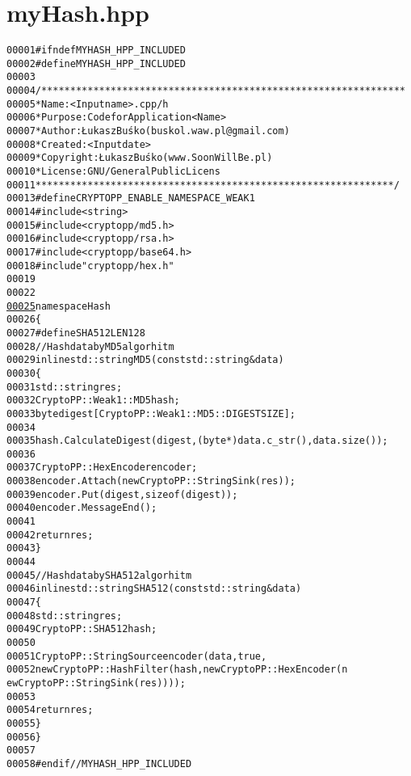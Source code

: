\hypertarget{myHash_8hpp_source}{
\section{myHash.hpp}
}


\begin{footnotesize}\begin{alltt}
00001 \textcolor{preprocessor}{#ifndef MYHASH\_HPP\_INCLUDED}
00002 \textcolor{preprocessor}{}\textcolor{preprocessor}{#define MYHASH\_HPP\_INCLUDED}
00003 \textcolor{preprocessor}{}
00004 \textcolor{comment}{/***************************************************************}
00005 \textcolor{comment}{ * Name:      <Input name>.cpp/h}
00006 \textcolor{comment}{ * Purpose:   Code for Application <Name>}
00007 \textcolor{comment}{ * Author:    Łukasz Buśko (buskol.waw.pl@gmail.com)}
00008 \textcolor{comment}{ * Created:   <Input date>}
00009 \textcolor{comment}{ * Copyright: Łukasz Buśko (www.SoonWillBe.pl)}
00010 \textcolor{comment}{ * License:   GNU / General Public Licens}
00011 \textcolor{comment}{ **************************************************************/}
00013 \textcolor{preprocessor}{#define CRYPTOPP\_ENABLE\_NAMESPACE\_WEAK 1}
00014 \textcolor{preprocessor}{}\textcolor{preprocessor}{#include <string>}
00015 \textcolor{preprocessor}{#include <cryptopp/md5.h>}
00016 \textcolor{preprocessor}{#include <cryptopp/rsa.h>}
00017 \textcolor{preprocessor}{#include <cryptopp/base64.h>}
00018 \textcolor{preprocessor}{#include "cryptopp/hex.h"}
00019 
00022 
\hypertarget{myHash_8hpp_source_l00025}{}\hyperlink{namespaceHash}{00025} \textcolor{keyword}{namespace }Hash
00026 \{
00027 \textcolor{preprocessor}{    #define SHA512LEN 128}
00028 \textcolor{preprocessor}{}        \textcolor{comment}{//Hash data by MD5 algorhitm}
00029         \textcolor{keyword}{inline} std::string MD5(\textcolor{keyword}{const} std::string &data)
00030         \{
00031                 std::string res;
00032                 CryptoPP::Weak1::MD5 hash;
00033                 byte digest[CryptoPP::Weak1::MD5::DIGESTSIZE];
00034 
00035                 hash.CalculateDigest(digest, (byte*)data.c\_str(), data.size());
00036 
00037                 CryptoPP::HexEncoder encoder;
00038                 encoder.Attach(\textcolor{keyword}{new} CryptoPP::StringSink(res));
00039                 encoder.Put(digest, \textcolor{keyword}{sizeof}(digest));
00040                 encoder.MessageEnd();
00041 
00042                 \textcolor{keywordflow}{return} res;
00043         \}
00044 
00045         \textcolor{comment}{//Hash data by SHA512 algorhitm}
00046         \textcolor{keyword}{inline} std::string SHA512(\textcolor{keyword}{const} std::string &data)
00047         \{
00048                 std::string res;
00049                 CryptoPP::SHA512 hash;
00050 
00051                 CryptoPP::StringSource encoder(data, \textcolor{keyword}{true},
00052                         \textcolor{keyword}{new} CryptoPP::HashFilter(hash, \textcolor{keyword}{new} CryptoPP::HexEncoder(\textcolor{keyword}{n
      ew} CryptoPP::StringSink(res))));
00053 
00054                 \textcolor{keywordflow}{return} res;
00055         \}
00056 \}
00057 
00058 \textcolor{preprocessor}{#endif // MYHASH\_HPP\_INCLUDED}
\end{alltt}\end{footnotesize}
